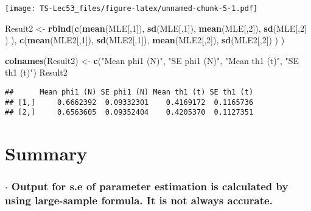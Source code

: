 \documentclass[]{article}
\newenvironment{Shaded}{\begin{snugshade}}{\end{snugshade}}
\newcommand{\DecValTok}[1]{\textcolor[rgb]{0.00,0.00,0.81}{#1}}
\newcommand{\KeywordTok}[1]{\textcolor[rgb]{0.13,0.29,0.53}{\textbf{#1}}}
\newcommand{\NormalTok}[1]{#1}
\newcommand{\StringTok}[1]{\textcolor[rgb]{0.31,0.60,0.02}{#1}}
\begin{document}
\texttt{[image: TS-Lec53\_files/figure-latex/unnamed-chunk-5-1.pdf]}

\begin{Shaded}
\begin{Highlighting}[]
\NormalTok{  Result2 <-}\StringTok{ }\KeywordTok{rbind}\NormalTok{(}\KeywordTok{c}\NormalTok{(}\KeywordTok{mean}\NormalTok{(MLE[,}\DecValTok{1}\NormalTok{]),   }\KeywordTok{sd}\NormalTok{(MLE[,}\DecValTok{1}\NormalTok{]),  }\KeywordTok{mean}\NormalTok{(MLE[,}\DecValTok{2}\NormalTok{]),   }\KeywordTok{sd}\NormalTok{(MLE[,}\DecValTok{2}\NormalTok{] ) ),}
        \KeywordTok{c}\NormalTok{(}\KeywordTok{mean}\NormalTok{(MLE2[,}\DecValTok{1}\NormalTok{]),  }\KeywordTok{sd}\NormalTok{(MLE2[,}\DecValTok{1}\NormalTok{]), }\KeywordTok{mean}\NormalTok{(MLE2[,}\DecValTok{2}\NormalTok{]),  }\KeywordTok{sd}\NormalTok{(MLE2[,}\DecValTok{2}\NormalTok{]) ) )}

  \KeywordTok{colnames}\NormalTok{(Result2) <-}\StringTok{ }\KeywordTok{c}\NormalTok{(}\StringTok{"Mean phi1 (N)"}\NormalTok{,   }\StringTok{"SE phi1 (N)"}\NormalTok{, }\StringTok{"Mean th1 (t)"}\NormalTok{, }\StringTok{"SE th1 (t)"}\NormalTok{)}
\NormalTok{  Result2 }
\end{Highlighting}
\end{Shaded}

\begin{verbatim}
##      Mean phi1 (N) SE phi1 (N) Mean th1 (t) SE th1 (t)
## [1,]     0.6662392  0.09332301    0.4169172  0.1165736
## [2,]     0.6563605  0.09352404    0.4205370  0.1127351
\end{verbatim}

\hypertarget{summary}{%
\section{Summary}\label{summary}}

\hypertarget{cdot-output-for-s.e-of-parameter-estimation-is-calculated-by-using-large-sample-formula.-it-is-not-always-accurate.}{%
\subsubsection{\texorpdfstring{\hspace{10mm} \(\cdot\) Output for s.e of
parameter estimation is calculated by using large-sample formula. It is
not always
accurate.}{ \textbackslash{}cdot Output for s.e of parameter estimation is calculated by using large-sample formula. It is not always accurate.}}\label{cdot-output-for-s.e-of-parameter-estimation-is-calculated-by-using-large-sample-formula.-it-is-not-always-accurate.}}
\end{document}
